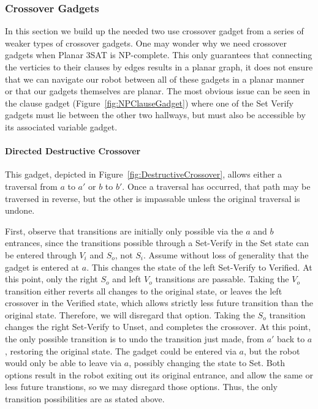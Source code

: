 \subsubsection{Crossover Gadgets}
\label{sec:NPCrossover}
In this section we build up the needed two use crossover gadget from a series of weaker types of crossover gadgets. One may wonder why we need crossover gadgets when Planar 3SAT is NP-complete. This only guarantees that connecting the verticies to their clauses by edges results in a planar graph, it does not ensure that we can navigate our robot between all of these gadgets in a planar manner or that our gadgets themselves are planar. The most obvious issue can be seen in the clause gadget (Figure~\ref{fig:NPClauseGadget}) where one of the Set Verify gadgets must lie between the other two hallways, but must also be accessible by its associated variable gadget.

\paragraph{Directed Destructive Crossover} This gadget, depicted in Figure~\ref{fig:DestructiveCrossover}, allows either a traversal from $a$ to $a'$ or $b$ to $b'$. Once a traversal has occurred, that path may be traversed in reverse, but the other is impassable unless the original traversal is undone.

First, observe that transitions are initially only possible via the $a$ and $b$ entrances, since the transitions possible through a Set-Verify in the Set state can be entered through $V_i$ and $S_o$, not $S_i$. Assume without loss of generality that the gadget is entered at $a$. This changes the state of the left Set-Verify to Verified. At this point, only the right $S_o$ and left $V_o$ transitions are passable. Taking the $V_o$ transition either reverts all changes to the original state, or leaves the left crossover in the Verified state, which allows strictly less future transition than the original state. Therefore, we will disregard that option. Taking the $S_o$ transition changes the right Set-Verify to Unset, and completes the crossover. At this point, the only possible transition is to undo the transition just made, from $a'$ back to $a$, restoring the original state. The gadget could be entered via $a$, but the robot would only be able to leave via $a$, possibly changing the state to Set. Both options result in the robot exiting out its original entrance, and allow the same or less future transtions, so we may disregard those options. Thus, the only transition possibilities are as stated above.

